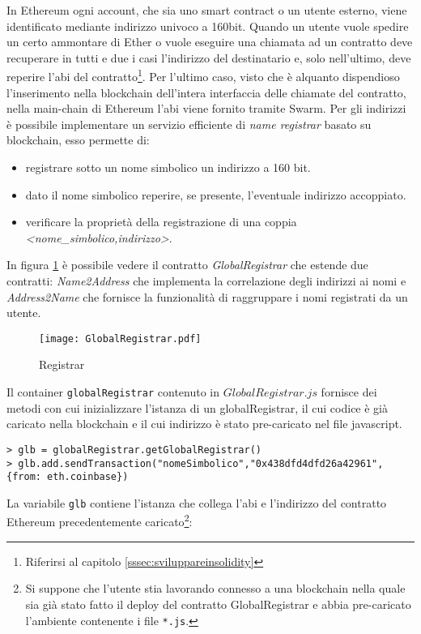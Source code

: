 	In Ethereum ogni account, che sia uno smart contract o un utente esterno, viene identificato mediante indirizzo univoco a 160bit. Quando un utente vuole spedire un certo ammontare di Ether o vuole eseguire una chiamata ad un contratto deve recuperare in tutti e due i casi l'indirizzo del destinatario e, solo nell'ultimo, deve reperire l'abi del contratto\footnote{Riferirsi al capitolo \ref{sssec:sviluppareinsolidity}}. Per l'ultimo caso, visto che è alquanto dispendioso l'inserimento nella blockchain dell'intera interfaccia delle chiamate del contratto, nella main-chain di Ethereum l'abi viene fornito tramite Swarm. Per gli indirizzi è possibile implementare un servizio efficiente di \textit{name registrar} basato su blockchain, esso permette di:
	\begin{itemize}
		\item registrare sotto un nome simbolico un indirizzo a 160 bit.
		\item dato il nome simbolico reperire, se presente, l'eventuale indirizzo accoppiato.
		\item verificare la proprietà della registrazione di una coppia \textit{<nome\_simbolico,indirizzo>}.
	\end{itemize}
	
	
	In figura \ref{fig:globalregistrar} è possibile vedere il contratto \textit{GlobalRegistrar} che estende due contratti: \textit{Name2Address} che implementa la correlazione degli indirizzi ai nomi e \textit{Address2Name} che fornisce la funzionalità di raggruppare i nomi registrati da un utente.
	
		\begin{figure}
			\caption{Registrar}
			\centering
			\texttt{[image: GlobalRegistrar.pdf]}
			\label{fig:globalregistrar}
		\end{figure}
		
	Il container \lstinline|globalRegistrar| contenuto in $GlobalRegistrar.js$ fornisce dei metodi con cui inizializzare l'istanza di un globalRegistrar, il cui codice è già caricato nella blockchain e il cui indirizzo è stato pre-caricato nel file javascript.
	
	
	
	\begin{lstlisting}
> glb = globalRegistrar.getGlobalRegistrar() 
> glb.add.sendTransaction("nomeSimbolico","0x438dfd4dfd26a42961",{from: eth.coinbase})	
	\end{lstlisting}
	
	La variabile \lstinline|glb| contiene l'istanza che collega l'abi e l'indirizzo del contratto Ethereum precedentemente caricato\footnote{Si suppone che l'utente stia lavorando connesso a una blockchain nella quale sia già stato fatto il deploy del contratto GlobalRegistrar e abbia pre-caricato l'ambiente contenente i file \lstinline|*.js|.}:
	
